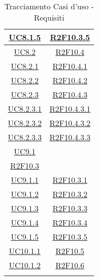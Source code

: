 \begin{longtable}{|c|c|}
	\hline
	\hyperlink{UC8.1.5}{UC8.1.5} & \hyperlink{R2F10.3.5}{R2F10.3.5}\\
	\hline
	\hyperlink{UC8.2}{UC8.2} & \hyperlink{R2F10.4}{R2F10.4}\\
	\hline
	\hyperlink{UC8.2.1}{UC8.2.1} & \hyperlink{R2F10.4.1}{R2F10.4.1}\\
	\hline
	\hyperlink{UC8.2.2}{UC8.2.2} & \hyperlink{R2F10.4.2}{R2F10.4.2}\\
	\hline
	\hyperlink{UC8.2.3}{UC8.2.3} & \hyperlink{R2F10.4.3}{R2F10.4.3}\\
	\hline
	\hyperlink{UC8.2.3.1}{UC8.2.3.1} & \hyperlink{R2F10.4.3.1}{R2F10.4.3.1}\\
	\hline
	\hyperlink{UC8.2.3.2}{UC8.2.3.2} & \hyperlink{R2F10.4.3.2}{R2F10.4.3.2}\\
	\hline
	\hyperlink{UC8.2.3.3}{UC8.2.3.3} & \hyperlink{R2F10.4.3.3}{R2F10.4.3.3}\\
	\hline
		\hyperlink{UC9.1}{UC9.1} &
	\begin{tabular}{c}
		\hyperlink{R2F10.2}{R2F10.2}\\ \hyperlink{R2F10.3}{R2F10.3}
	\end{tabular} \\ 
	\hline
	\hyperlink{UC9.1.1}{UC9.1.1} & \hyperlink{R2F10.3.1}{R2F10.3.1}\\
	\hline
	\hyperlink{UC9.1.2}{UC9.1.2} & \hyperlink{R2F10.3.2}{R2F10.3.2}\\
	\hline
	\hyperlink{UC9.1.3}{UC9.1.3} & \hyperlink{R2F10.3.3}{R2F10.3.3}\\
	\hline
	\hyperlink{UC9.1.4}{UC9.1.4} & \hyperlink{R2F10.3.4}{R2F10.3.4}\\
	\hline
	\hyperlink{UC9.1.5}{UC9.1.5} & \hyperlink{R2F10.3.5}{R2F10.3.5}\\
	\hline
	\hyperlink{UC10.1.1}{UC10.1.1} &  \hyperlink{R2F10.5}{R2F10.5}\\
	\hline
	\hyperlink{UC10.1.2}{UC10.1.2} & \hyperlink{R2F10.6}{R2F10.6} \\
	\hline
	\caption[Tracciamento Casi d'uso - Requisiti]{Tracciamento Casi d'uso - Requisiti}
	\label{tabella:requi-usecase}
\end{longtable}
\renewcommand{\arraystretch}{1}
\clearpage

